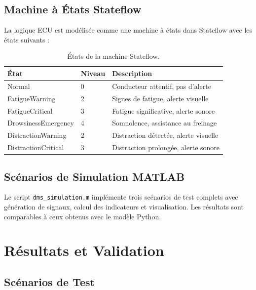 \documentclass[12pt,a4paper]{report}
\begin{document}
\section{Machine à États Stateflow}

La logique ECU est modélisée comme une machine à états dans Stateflow avec les états suivants :

\begin{table}[H]
    \centering
    \caption{États de la machine Stateflow.}
    \begin{tabular}{llp{6cm}}
        \toprule
        \textbf{État} & \textbf{Niveau} & \textbf{Description} \\
        \midrule
        Normal & 0 & Conducteur attentif, pas d'alerte \\
        FatigueWarning & 2 & Signes de fatigue, alerte visuelle \\
        FatigueCritical & 3 & Fatigue significative, alerte sonore \\
        DrowsinessEmergency & 4 & Somnolence, assistance au freinage \\
        DistractionWarning & 2 & Distraction détectée, alerte visuelle \\
        DistractionCritical & 3 & Distraction prolongée, alerte sonore \\
        \bottomrule
    \end{tabular}
\end{table}

\section{Scénarios de Simulation MATLAB}

Le script \texttt{dms\_simulation.m} implémente trois scénarios de test complets avec génération de signaux, calcul des indicateurs et visualisation. Les résultats sont comparables à ceux obtenus avec le modèle Python.

\chapter{Résultats et Validation}

\section{Scénarios de Test}
\end{document}

